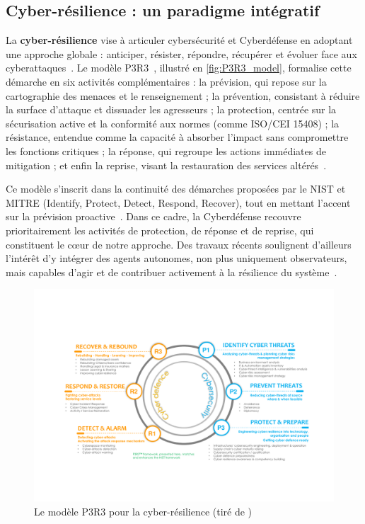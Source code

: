 \subsection*{Cyber-résilience : un paradigme intégratif}

La \textbf{cyber-résilience} vise à articuler cybersécurité et Cyberdéfense en adoptant une approche globale : anticiper, résister, répondre, récupérer et évoluer face aux cyberattaques~\cite{NISTresilience}. Le modèle P3R3~\cite{Theron2013P3R3}, illustré en \autoref{fig:P3R3_model}, formalise cette démarche en six activités complémentaires : la prévision, qui repose sur la cartographie des menaces et le renseignement ; la prévention, consistant à réduire la surface d'attaque et dissuader les agresseurs ; la protection, centrée sur la sécurisation active et la conformité aux normes (comme ISO/CEI 15408) ; la résistance, entendue comme la capacité à absorber l'impact sans compromettre les fonctions critiques ; la réponse, qui regroupe les actions immédiates de mitigation ; et enfin la reprise, visant la restauration des services altérés~\cite{Theron2013P3R3}.

Ce modèle s'inscrit dans la continuité des démarches proposées par le \ac{NIST} et MITRE (Identify, Protect, Detect, Respond, Recover), tout en mettant l'accent sur la prévision proactive~\cite{Theron2013P3R3}. Dans ce cadre, la Cyberdéfense recouvre prioritairement les activités de protection, de réponse et de reprise, qui constituent le cœur de notre approche. Des travaux récents soulignent d'ailleurs l'intérêt d'y intégrer des agents autonomes, non plus uniquement observateurs, mais capables d'agir et de contribuer activement à la résilience du système~\cite{Kott2023}.

\begin{figure}[h]
    \centering
    \includegraphics[width=\linewidth]{figures/P3R3.pdf}
    \caption{Le modèle P3R3 pour la cyber-résilience (tiré de \autocite{Kott2023})}
    \label{fig:P3R3_model}
\end{figure}

